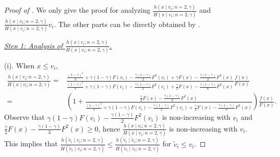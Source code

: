 \begin{proof}[{Proof of }]

We only give the proof for analyzing $\frac{h(x\mid v_i;n=2,\gamma)}{H(x\mid v_i;n=2,\gamma)}$ and $\frac{h(x\mid v_i;n=2,\gamma)}{H(x\mid v_i;n=2,\gamma)}v_i$. The other parts can be directly obtained by .

\medskip

\noindent\textit{\underline{Step 1: Analysis of $\frac{h(x\mid v_i;n=2,\gamma)}{H(x\mid v_i;n=2,\gamma)}$.}}

\medskip

\noindent (i). When $x\leq v_i$,
\begin{align*}
\frac{h(x\mid v_i;n=2,\gamma)}{H(x\mid v_i;n=2,\gamma)} =& \frac{\frac{ (1-\gamma)^2}{3}  + \gamma (1-\gamma)F\left(v_i\right) - \frac{\gamma(1-\gamma)}{2} F^2\left(v_i\right) + \gamma F\left(x\right) - \frac{\gamma(1-\gamma)}{2} F^2\left(x\right)}{\frac{ (1-\gamma)^2}{3}  + \gamma (1-\gamma)F\left(v_i\right) - \frac{\gamma(1-\gamma)}{2} F^2\left(v_i\right) + \frac{\gamma}{2}  F\left(x\right)  - \frac{\gamma(1-\gamma)}{6}F^2\left(x\right)} \frac{f(x)}{F(x)} \\
=&\left(1 + \frac{\frac{\gamma}{2} F\left(x\right) - \frac{\gamma(1-\gamma)}{3} F^2\left(x\right)}{\frac{ (1-\gamma)^2}{3}  + \gamma (1-\gamma)F\left(v_i\right) - \frac{\gamma(1-\gamma)}{2} F^2\left(v_i\right) + \frac{\gamma}{2}  F\left(x\right)  - \frac{\gamma(1-\gamma)}{6}F^2\left(x\right)} \right)\frac{f(x)}{F(x)}.
\end{align*}
Observe that $\gamma (1-\gamma)F\left(v_i\right) - \frac{\gamma(1-\gamma)}{2} F^2\left(v_i\right)$ is non-increasing with $v_i$ and $\frac{\gamma}{2} F\left(x\right) - \frac{\gamma(1-\gamma)}{3} F^2\left(x\right)\geq 0$, hence $\frac{h(x\mid v_i;n=2,\gamma)}{H(x\mid v_i;n=2,\gamma)}$ is non-increasing with $v_i$. This implies that $\frac{h(\tilde{v}_i\mid v_i;n=2,\gamma)}{H(\tilde{v}_i\mid v_i;n=2,\gamma)}  \leq \frac{h(\tilde{v}_i\mid \tilde{v}_i;n=2,\gamma)}{H(\tilde{v}_i\mid \tilde{v}_i;n=2,\gamma)}$ for $\tilde{v}_i \leq v_i$.

\medskip


\end{proof}
